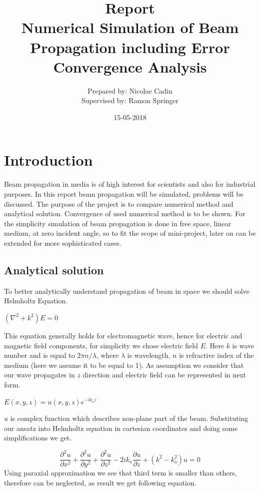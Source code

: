 \documentclass[a4paper]{article}
\title{Report\\Numerical Simulation of Beam Propagation including Error Convergence Analysis}
\date{15-05-2018}
\author{Prepared by: Nicolae Cadin \\Supervised by: Ramon Springer}
\begin{document}
		
	\maketitle
	\newpage
	\tableofcontents	

	
	\newpage
	\section{Introduction}
	Beam propagation in media is of high interest for scientists and also for industrial purposes. 
	In this report beam propagation will be simulated, problems will be discussed. The purpose of the project is to compare numerical method and analytical solution. Convergence of used numerical method is to be shown. For the simplicity simulation of beam propagation is done in free space, linear medium, at zero incident angle, so to fit the scope of mini-project, later on can be extended for more sophisticated cases.
	\subsection{Analytical solution}
	To better analytically understand propagation of beam in space we should solve Helmholtz Equation.
	\begin{center}
		$(\nabla^2+k^2)E = 0$		
	\end{center}
	This equation generally holds for electromagnetic wave, hence for electric and magnetic field components, for simplicity we chose electric field $E$. Here $k$ is wave number and is equal to $2\pi n/\lambda$, where $\lambda$ is wavelength, $n$ is refractive index of the medium (here we assume it to be equal to 1). As assumption we consider that our wave propagates in $z$ direction and electric field can be represented in next form.
	\begin{center}
		$E(x,y,z)=u(x,y,z)e^{-ik_oz}$
	\end{center}
	$u$ is complex function which describes non-plane part of the beam. Substituting our ansatz into Helmholtz equation in cartesian coordinates and doing some simplifications we get.

	\[\frac{\partial^2 u}{\partial x^2}+ \frac{\partial^2 u}{\partial y^2}+ \frac{\partial^2 u}{\partial z^2} - 2ik_o\frac{\partial u}{\partial z}+(k^2-k_o^2)u=0\]
	Using paraxial approximation we see that third term is smaller than others, therefore can be neglected, as result we get following equation.
	
\end{document}
